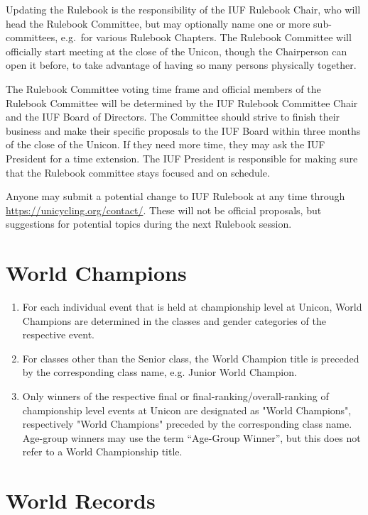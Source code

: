 Updating the Rulebook is the responsibility of the IUF Rulebook Chair, who will head the Rulebook Committee, but may optionally name one or more sub-committees, e.g.\ for various Rulebook Chapters.
The Rulebook Committee will officially start meeting at the close of the Unicon, though the Chairperson can open it before, to take advantage of having so many persons physically together.

The Rulebook Committee voting time frame and official members of the Rulebook Committee will be determined by the IUF Rulebook Committee Chair and the IUF Board of Directors.
The Committee should strive to finish their business and make their specific proposals to the IUF Board within three months of the close of the Unicon.
If they need more time, they may ask the IUF President for a time extension.
The IUF President is responsible for making sure that the Rulebook committee stays focused and on schedule.

Anyone may submit a potential change to IUF Rulebook at any time through \url{https://unicycling.org/contact/}.
These will not be official proposals, but suggestions for potential topics during the next Rulebook session.

\section{World Champions}

\begin{enumerate}[leftmargin=1.5em,labelsep=*]
	\item For each individual event that is held at championship level at Unicon, World Champions are determined in the classes and gender categories of the respective event.
	\item For classes other than the Senior class, the World Champion title is preceded by the corresponding class name, e.g. Junior World Champion.
	\item Only winners of the respective final or final-ranking/overall-ranking of championship level events at Unicon are designated as "World Champions", respectively "World Champions" preceded by the corresponding class name.
	Age-group winners may use the term “Age-Group Winner”, but this does not refer to a World Championship title.
\end{enumerate}

\section{World Records}

